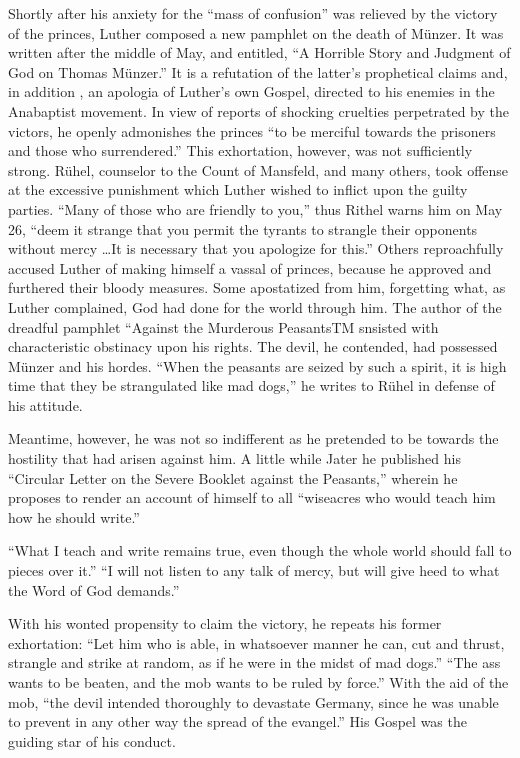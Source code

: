 Shortly after his anxiety for the “mass of confusion” was relieved
by the victory of the princes, Luther composed a new pamphlet on
the death of Münzer. It was written after the middle of May, and
entitled, “A Horrible Story and Judgment of God on Thomas Münzer.”
It is a refutation of the latter’s prophetical claims and, in addition
, an apologia of Luther’s own Gospel, directed to his enemies in
the Anabaptist movement. In view of reports of shocking cruelties
perpetrated by the victors, he openly admonishes the princes “to be
merciful towards the prisoners and those who surrendered.” This
exhortation, however, was not sufficiently strong. Rühel, counselor to
the Count of Mansfeld, and many others, took offense at the excessive
punishment which Luther wished to inflict upon the guilty parties.
“Many of those who are friendly to you,” thus Rithel warns him on
May 26, “deem it strange that you permit the tyrants to strangle
their opponents without mercy \dots It is necessary that you apologize
for this.” Others reproachfully accused Luther of making himself a vassal
of princes, because he approved and furthered their
bloody measures. Some apostatized from him, forgetting what, as
Luther complained, God had done for the world through him. The
author of the dreadful pamphlet “Against the Murderous PeasantsTM
snsisted with characteristic obstinacy upon his rights. The devil, he
contended, had possessed Münzer and his hordes. “When the peasants
are seized by such a spirit, it is high time that they be strangulated
like mad dogs,” he writes to Rühel in defense of his attitude.

Meantime, however, he was not so indifferent as he pretended
to be towards the hostility that had arisen against him. A little while
Jater he published his “Circular Letter on the Severe Booklet against
the Peasants,” wherein he proposes to render an account of himself to
all “wiseacres who would teach him how he should write.”

“What I teach and write remains true, even though the whole world
should fall to pieces over it.” “I will not listen to any talk of mercy, but
will give heed to what the Word of God demands.”

With his wonted propensity to claim the victory, he repeats his former
exhortation: “Let him who is able, in whatsoever manner he can, cut and
thrust, strangle and strike at random, as if he were in the midst of mad
dogs.” “The ass wants to be beaten, and the mob wants to be ruled by force.”
With the aid of the mob, “the devil intended thoroughly to devastate
Germany, since he was unable to prevent in any other way the spread of the
evangel.” His Gospel was the guiding star of his conduct.

